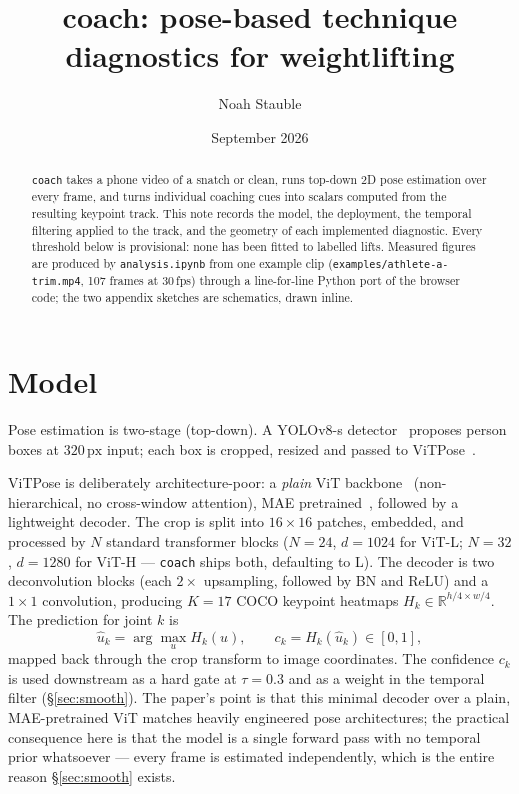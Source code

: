 \documentclass[10pt,a4paper]{article}
\title{\textbf{coach}: pose-based technique diagnostics for weightlifting}
\author{Noah Stauble}
\date{September 2026}
\newcommand{\conf}{c}
\begin{document}
\maketitle
\vspace{-1.2em}
\begin{abstract}
\noindent
\texttt{coach} takes a phone video of a snatch or clean, runs top-down 2D pose
estimation over every frame, and turns individual coaching cues into scalars
computed from the resulting keypoint track. This note records the model, the
deployment, the temporal filtering applied to the track, and the geometry of
each implemented diagnostic. Every threshold below is provisional: none has
been fitted to labelled lifts. Measured figures are produced by
\texttt{analysis.ipynb} from one example clip
(\texttt{examples/athlete-a-trim.mp4}, 107 frames at 30\,fps) through a
line-for-line Python port of the browser code; the two appendix sketches are
schematics, drawn inline.
\end{abstract}

\section{Model}

Pose estimation is two-stage (top-down). A YOLOv8-s detector~\cite{yolov8}
proposes person boxes at $320\,\mathrm{px}$ input; each box is cropped, resized
and passed to ViTPose~\cite{vitpose}.

ViTPose is deliberately architecture-poor: a \emph{plain} ViT
backbone~\cite{vit} (non-hierarchical, no cross-window attention), MAE
pretrained~\cite{mae}, followed by a lightweight decoder. The crop is split into
$16\times16$ patches, embedded, and processed by $N$ standard transformer blocks
($N=24$, $d=1024$ for ViT-L; $N=32$, $d=1280$ for ViT-H --- \texttt{coach} ships
both, defaulting to L). The decoder is two deconvolution blocks (each
$2\times$ upsampling, followed by BN and ReLU) and a $1\times1$ convolution,
producing $K=17$ COCO keypoint heatmaps $H_k\in\mathbb{R}^{h/4\times w/4}$. The
prediction for joint $k$ is
\[
  \hat{u}_k=\arg\max_{u} H_k(u),
  \qquad
  \conf_k=H_k(\hat{u}_k)\in[0,1],
\]
mapped back through the crop transform to image coordinates. The confidence
$\conf_k$ is used downstream as a hard gate at $\tau=0.3$ and as a weight in the
temporal filter (\S\ref{sec:smooth}). The paper's point is that this minimal
decoder over a plain, MAE-pretrained ViT matches heavily engineered pose
architectures; the practical consequence here is that the model is a single
forward pass with no temporal prior whatsoever --- every frame is estimated
independently, which is the entire reason \S\ref{sec:smooth} exists.
\end{document}
